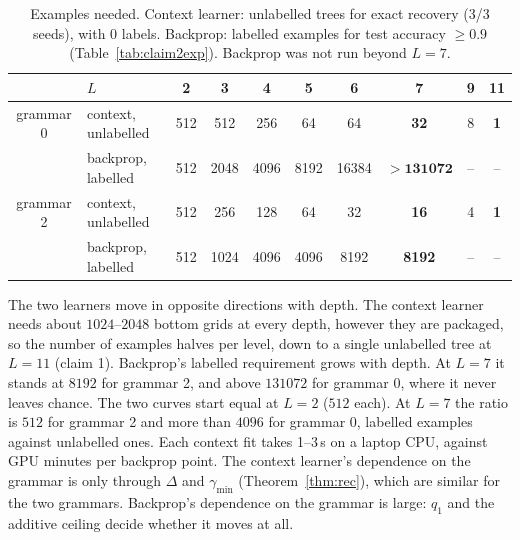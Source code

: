 \documentclass[11pt]{article}
\theoremstyle{definition}
\begin{document}
\begin{table}[h]\centering
\caption{Examples needed. Context learner: unlabelled trees for exact recovery (3/3 seeds), with $0$
labels. Backprop: labelled examples for test accuracy $\ge0.9$ (Table~\ref{tab:claim2exp}). Backprop
was not run beyond $L=7$.}\label{tab:h2h}
\small\begin{tabular}{cl|cccccccc}\toprule
& $L$ & 2 & 3 & 4 & 5 & 6 & 7 & 9 & 11\\\midrule
grammar 0 & context, unlabelled & 512 & 512 & 256 & 64 & 64 & \textbf{32} & 8 & \textbf{1}\\
& backprop, labelled & 512 & 2048 & 4096 & 8192 & 16384 & $\mathbf{>131072}$ & -- & --\\\midrule
grammar 2 & context, unlabelled & 512 & 256 & 128 & 64 & 32 & \textbf{16} & 4 & \textbf{1}\\
& backprop, labelled & 512 & 1024 & 4096 & 4096 & 8192 & \textbf{8192} & -- & --\\
\bottomrule\end{tabular}
\end{table}

\noindent The two learners move in opposite directions with depth. The context learner needs about
$1024$--$2048$ bottom grids at every depth, however they are packaged, so the number of examples halves
per level, down to a single unlabelled tree at $L=11$ (claim 1). Backprop's labelled requirement grows
with depth. At $L=7$ it stands at $8192$ for grammar 2, and above $131072$ for grammar 0, where it never
leaves chance. The two curves start equal at $L=2$ ($512$ each). At $L=7$ the ratio is $512$ for
grammar 2 and more than $4096$ for grammar 0, labelled examples against unlabelled ones. Each context
fit takes 1--3\,s on a laptop CPU, against GPU minutes per backprop point. The context learner's
dependence on the grammar is only through $\Delta$ and $\gamma_{\min}$ (Theorem~\ref{thm:rec}), which
are similar for the two grammars. Backprop's dependence on the grammar is large: $q_1$ and the additive
ceiling decide whether it moves at all.
\end{document}
